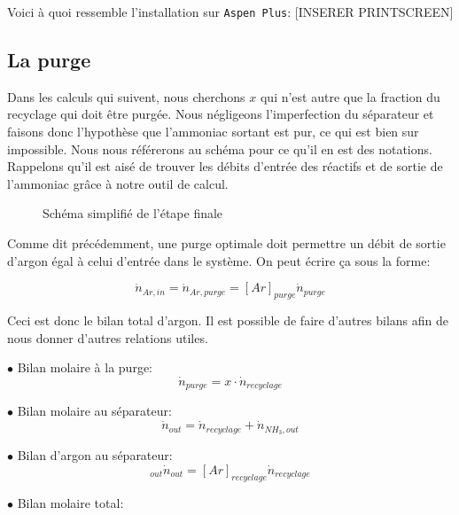 \documentclass[a4paper, oneside, 12pt]{article}
\begin{document}
Voici à quoi ressemble l'installation sur \texttt{Aspen Plus}:
[INSERER PRINTSCREEN]

\subsection{La purge}

Dans les calculs qui suivent, nous cherchons $x$ qui n'est autre que la fraction du recyclage 
qui doit être purgée. Nous négligeons l'imperfection du séparateur et faisons donc l'hypothèse que l'ammoniac sortant est pur, ce qui est bien sur impossible. Nous nous référerons au schéma pour ce qu'il en est des notations. 
Rappelons qu'il est aisé de trouver les débits d'entrée des réactifs 
et de sortie de l'ammoniac grâce à notre outil de calcul.

\begin{figure}[h!]
	\begin{center}
		
	\end{center}
	\caption{Schéma simplifié de l'étape finale}
	\label{fig:schema}
\end{figure}

Comme dit précédemment, une purge optimale doit permettre un débit 
de sortie d'argon égal à celui d'entrée dans le système. 
On peut écrire ça sous la forme:

\begin{equation}
\dot{n}_{Ar,in}=\dot{n}_{Ar,purge}=[Ar]_{purge} \dot{n}_{purge}
\end{equation}

Ceci est donc le bilan total d'argon. 
Il est possible de faire d'autres bilans afin de nous donner d'autres relations utiles.

$\bullet$ Bilan molaire à la purge:
\begin{equation}
\dot{n}_{purge} = x \cdot \dot{n}_{recyclage}
\label{eq:bilan_mol_purge}
\end{equation}

$\bullet$ Bilan molaire au séparateur:
\begin{equation}
\dot{n}_{out}=\dot{n}_{recyclage}+\dot{n}_{NH_3,out}
\label{eq:bilan_mol_sep}
\end{equation}

$\bullet$ Bilan d'argon au séparateur:
\begin{equation}
[Ar]_{out} \dot{n}_{out}=[Ar]_{recyclage} \dot{n}_{recyclage}
\end{equation}

$\bullet$ Bilan molaire total:
\end{document}
